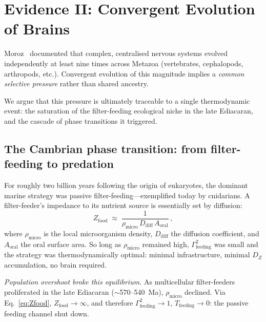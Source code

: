 ﻿\documentclass[aps,pre,twocolumn,superscriptaddress,floatfix]{revtex4-2}
\begin{document}
\section{Evidence II: Convergent Evolution of Brains}
\label{sec:brains}

Moroz~\cite{Moroz2012} documented that complex,
centralised nervous systems evolved independently
at least nine times across Metazoa
(vertebrates, cephalopods, arthropods, etc.).
Convergent evolution of this magnitude implies a
\emph{common selective pressure} rather than shared ancestry.

We argue that this pressure is ultimately traceable to a
single thermodynamic event: the saturation of the
filter-feeding ecological niche in the late Ediacaran,
and the cascade of phase transitions it triggered.

\subsection{The Cambrian phase transition:
from filter-feeding to predation}
\label{sec:cambrian}

For roughly two billion years following the origin of
eukaryotes, the dominant marine strategy was passive
filter-feeding---exemplified today by cnidarians.
A filter-feeder's impedance to its nutrient source
is essentially set by diffusion:
\begin{equation}
  Z_{\mathrm{food}} \;\approx\;
    \frac{1}{\rho_{\mathrm{micro}}\,D_{\mathrm{diff}}\,A_{\mathrm{oral}}}\,,
  \label{eq:Zfood}
\end{equation}
where $\rho_{\mathrm{micro}}$ is the local microorganism
density, $D_{\mathrm{diff}}$ the diffusion coefficient,
and $A_{\mathrm{oral}}$ the oral surface area.
So long as $\rho_{\mathrm{micro}}$ remained high,
$\Gamma_{\mathrm{feeding}}^2$ was small and the strategy
was thermodynamically optimal: minimal infrastructure,
minimal $D_Z$ accumulation, no brain required.

\emph{Population overshoot broke this equilibrium.}
As multicellular filter-feeders proliferated in the
late Ediacaran ($\sim$570--540~Ma),
$\rho_{\mathrm{micro}}$ declined.
Via Eq.~\eqref{eq:Zfood}, $Z_{\mathrm{food}} \to \infty$,
and therefore $\Gamma_{\mathrm{feeding}}^2 \to 1$,
$T_{\mathrm{feeding}} \to 0$:
the passive feeding channel shut down.
\end{document}
